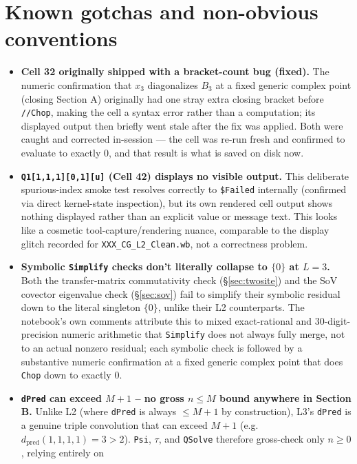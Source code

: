 \documentclass[11pt]{article}
\begin{document}
\section{Known gotchas and non-obvious conventions}
\label{sec:gotchas}

\begin{itemize}
\item \textbf{Cell 32 originally shipped with a bracket-count bug (fixed).} The numeric confirmation
  that $x_3$ diagonalizes $B_3$ at a fixed generic complex point (closing Section A) originally had
  one stray extra closing bracket before \texttt{//Chop}, making the cell a syntax error rather than
  a computation; its displayed output then briefly went stale after the fix was applied. Both were
  caught and corrected in-session --- the cell was re-run fresh and confirmed to evaluate to exactly
  $0$, and that result is what is saved on disk now.
\item \textbf{\texttt{Q1[1,1,1][0,1][u]} (Cell 42) displays no visible output.} This deliberate
  spurious-index smoke test resolves correctly to \texttt{\$Failed} internally (confirmed via direct
  kernel-state inspection), but its own rendered cell output shows nothing displayed rather than an
  explicit value or message text. This looks like a cosmetic tool-capture/rendering nuance,
  comparable to the display glitch recorded for \texttt{XXX\_CG\_L2\_Clean.wb}, not a correctness
  problem.
\item \textbf{Symbolic \texttt{Simplify} checks don't literally collapse to $\{0\}$ at $L=3$.} Both
  the transfer-matrix commutativity check (\S\ref{sec:twosite}) and the SoV covector eigenvalue check
  (\S\ref{sec:sov}) fail to simplify their symbolic residual down to the literal singleton $\{0\}$,
  unlike their L2 counterparts. The notebook's own comments attribute this to mixed exact-rational
  and 30-digit-precision numeric arithmetic that \texttt{Simplify} does not always fully merge, not
  to an actual nonzero residual; each symbolic check is followed by a substantive numeric
  confirmation at a fixed generic complex point that does \texttt{Chop} down to exactly $0$.
\item \textbf{\texttt{dPred} can exceed $M+1$ -- no gross $n\le M$ bound anywhere in Section B.}
  Unlike L2 (where \texttt{dPred} is always $\le M+1$ by construction), L3's \texttt{dPred} is a
  genuine triple convolution that can exceed $M+1$ (e.g.\ $d_{\mathrm{pred}}(1,1,1,1)=3>2$).
  \texttt{Psi}, $\tau$, and \texttt{QSolve} therefore gross-check only $n\ge0$, relying entirely on

\end{itemize}
\end{document}
